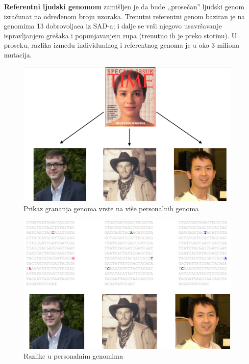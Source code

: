 \textbf{Referentni ljudski genomom} zamišljen je da bude ‚‚prosečan'' ljudski genom izračunat na određenom broju uzoraka. Trenutni referentni genom baziran je na genomima 13 dobrovoljaca iz SAD-a; i dalje se vrši njegovo usavršavanje ispravljanjem grešaka i popunjavanjem rupa (trenutno ih je preko stotinu). U proseku, razlika između individualnog i referentnog genoma je u oko 3 miliona mutacija.

\iffalse 
\begin{figure}[h!]
\centering
\includegraphics[scale=0.5]{poglavlja/9/slike/OdGenomaVrsteDoPersonalnih.png}
\caption{Prikaz grananja genoma vrste na više personalnih genoma}
\label{slika:X}
\end{figure}


\begin{figure}[h!]
\centering
\includegraphics[scale=0.5]{poglavlja/9/slike/OdGenomaVrsteDoPersonalnih2.png}
\caption{Razlike u personalnim genomima}
\label{slika:X}
\end{figure}

